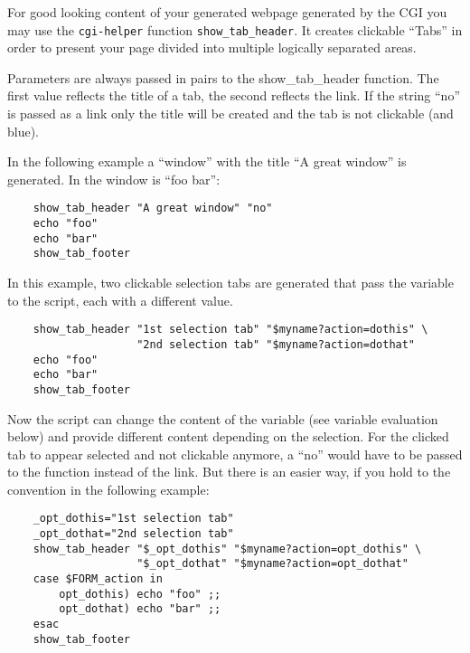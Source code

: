 For good looking content of your generated webpage generated by the CGI
you may use the \texttt{cgi-helper} function \texttt{show\_tab\_header}.
It creates clickable ``Tabs'' in order to present your page divided into
multiple logically separated areas.

Parameters are always passed in pairs to the show\_tab\_header function.
The first value reflects the title of a tab, the second reflects the link.
If the string ``no'' is passed as a link only the title will be created
and the tab is not clickable (and blue).

In the following example a ``window'' with the title ``A great window''
is generated. In the window is ``foo bar'':

\begin{example}
\begin{verbatim}
    show_tab_header "A great window" "no"
    echo "foo"
    echo "bar"
    show_tab_footer
\end{verbatim}
\end{example}

In this example, two clickable selection tabs are generated that pass
the variable  to the script, each with a different value.

\begin{example}
\begin{verbatim}
    show_tab_header "1st selection tab" "$myname?action=dothis" \
                    "2nd selection tab" "$myname?action=dothat"
    echo "foo"
    echo "bar"
    show_tab_footer
\end{verbatim}
\end{example}

Now the script can change the content of the variable  (see variable
evaluation below) and provide different content depending on the selection.
For the clicked tab to appear selected and not clickable anymore, a ``no''
would have to be passed to the function instead of the link. But there is an
easier way, if you hold to the convention in the following example:

\begin{example}
\begin{verbatim}
    _opt_dothis="1st selection tab"
    _opt_dothat="2nd selection tab"
    show_tab_header "$_opt_dothis" "$myname?action=opt_dothis" \
                    "$_opt_dothat" "$myname?action=opt_dothat"
    case $FORM_action in
        opt_dothis) echo "foo" ;;
        opt_dothat) echo "bar" ;;
    esac
    show_tab_footer
\end{verbatim}
\end{example}

